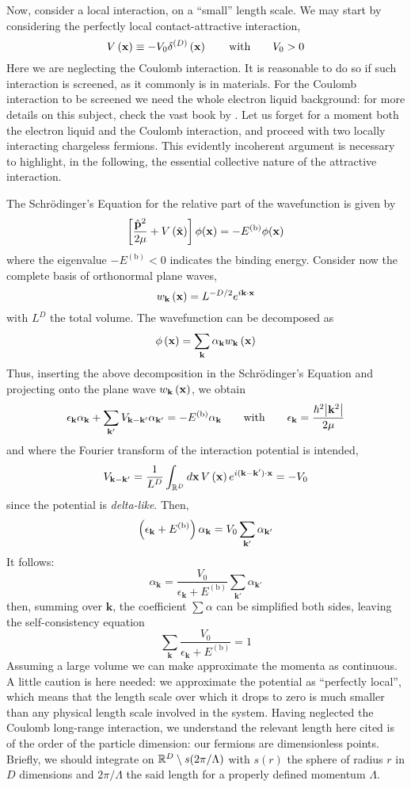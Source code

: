 Now, consider a local interaction, on a ``small'' length scale. We may start by considering the perfectly local contact-attractive interaction,
\[
	V \lrR{\mathbf{x}} \equiv - V_0 \delta^{(D)} \lrR{\mathbf{x}}
	\quad\qq{with}\quad
	V_0 > 0
\]
Here we are neglecting the Coulomb interaction. It is reasonable to do so if such interaction is screened, as it commonly is in materials. For the Coulomb interaction to be screened we need the whole electron liquid background: for more details on this subject, check the vast book  \cite{giuliani2008quantum} by \citeauthor{giuliani2008quantum}. Let us forget for a moment both the electron liquid and the Coulomb interaction, and proceed with two locally interacting chargeless fermions. This evidently incoherent argument is necessary to highlight, in the following, the essential collective nature of the attractive interaction.

The Schrödinger's Equation for the relative part of the wavefunction is given by
\[
	\left[{\frac{\hat{\mathbf{p}}^2}{2\mu} + V \left({\hat{\mathbf{x}}}\right)}\right] \phi(\mathbf{x}) = - E^{(\mathrm{b})} \phi(\mathbf{x})
\]
where the eigenvalue $- E^{(\mathrm{b})} < 0$ indicates the binding energy. Consider now the complete basis of orthonormal plane waves,
\[
	w_\mathbf{k} \left({\mathbf{x}}\right) = L^{-D/2} e^{i \mathbf{k} \cdot \mathbf{x}}
\]
with $L^D$ the total volume. The wavefunction can be decomposed as
\[
	\phi\left({\mathbf{x}}\right) = \sum_\mathbf{k} \alpha_\mathbf{k} w_\mathbf{k} \left({\mathbf{x}}\right)
\]
Thus, inserting the above decomposition in the Schrödinger's Equation and projecting onto the plane wave $w_\mathbf{k} \left({\mathbf{x}}\right)$, we obtain
\[
	\epsilon_\mathbf{k} \alpha_\mathbf{k} + \sum_{\mathbf{k}'} V_{\mathbf{k}-\mathbf{k}'} \alpha_{\mathbf{k}'} = - E^{(\mathrm{b})} \alpha_\mathbf{k}
	\quad\qq{with}\quad
	\epsilon_\mathbf{k} = \frac{\hbar^2 \abs{\mathbf{k}^2}}{2\mu}
\]
and where the Fourier transform of the interaction potential is intended,
\[
	V_{\mathbf{k}-\mathbf{k}'} = \frac{1}{L^D} \int_{\mathbb{R}^D} d\mathbf{x} \, V \left({\mathbf{x}}\right) e^{i(\mathbf{k}-\mathbf{k}') \cdot \mathbf{x}} = - V_0
\]
since the potential is \textit{delta-like}.  Then,
\[
	\left({\epsilon_\mathbf{k} + E^{(\mathrm{b})}}\right) \alpha_\mathbf{k} = V_0 \sum_{\mathbf{k}'} \alpha_{\mathbf{k}'}
\]
It follows:
\[
	\alpha_\mathbf{k} = \frac{V_0}{\epsilon_\mathbf{k} + E^{(\mathrm{b})}} \sum_{\mathbf{k}'} \alpha_{\mathbf{k}'}
\]
then, summing over $\mathbf{k}$, the coefficient $\sum \alpha$ can be simplified both sides, leaving the self-consistency equation
\[
	\sum_\mathbf{k} \frac{V_0}{\epsilon_\mathbf{k} + E^{(\mathrm{b})}} = 1
\]
Assuming a large volume we can make approximate the momenta as continuous. A little caution is here needed: we approximate the potential as ``perfectly local'', which means that the length scale over which it drops to zero is much smaller than any physical length scale involved in the system. Having neglected the Coulomb long-range interaction, we understand the relevant length here cited is of the order of the particle dimension: our fermions are dimensionless points. Briefly, we should integrate on $\mathbb{R}^D \setminus s(2\pi/\Lambda)$ with $s(r)$ the sphere of radius $r$ in $D$ dimensions and $2\pi/\Lambda$ the said length for a properly defined momentum $\Lambda$.

